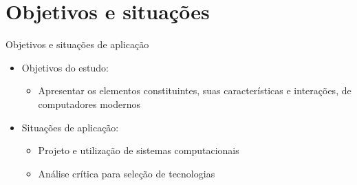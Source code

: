 \section[ slide = true]{Objetivos e situações}
\begin{slide}[toc=]{Objetivos e situações de aplicação}
\begin{itemize}
  \item Objetivos do estudo:
  \begin{itemize}
    \item Apresentar os elementos constituintes, suas características e interações, de computadores modernos
  \end{itemize}
  \item Situações de aplicação:
  \begin{itemize}
    \item Projeto e utilização de sistemas computacionais
    \item Análise crítica para seleção de tecnologias
  \end{itemize}
\end{itemize}
\end{slide}

